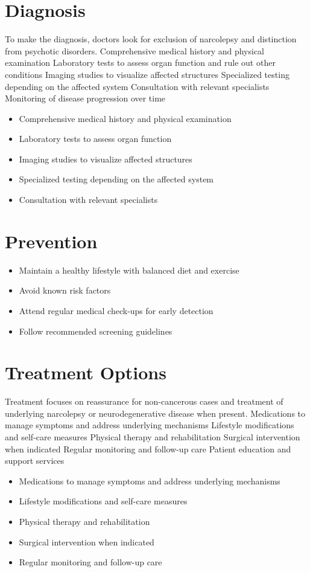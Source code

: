 \section{Diagnosis}
To make the diagnosis, doctors look for exclusion of narcolepsy and distinction from psychotic disorders. Comprehensive medical history and physical examination Laboratory tests to assess organ function and rule out other conditions Imaging studies to visualize affected structures Specialized testing depending on the affected system Consultation with relevant specialists Monitoring of disease progression over time

\begin{itemize}[noitemsep]
  \item Comprehensive medical history and physical examination
  \item Laboratory tests to assess organ function
  \item Imaging studies to visualize affected structures
  \item Specialized testing depending on the affected system
  \item Consultation with relevant specialists
\end{itemize}
\section{Prevention}
\begin{itemize}[noitemsep]
  \item Maintain a healthy lifestyle with balanced diet and exercise
  \item Avoid known risk factors
  \item Attend regular medical check-ups for early detection
  \item Follow recommended screening guidelines
\end{itemize}
\section{Treatment Options}
Treatment focuses on reassurance for non-cancerous cases and treatment of underlying narcolepsy or neurodegenerative disease when present. Medications to manage symptoms and address underlying mechanisms Lifestyle modifications and self-care measures Physical therapy and rehabilitation Surgical intervention when indicated Regular monitoring and follow-up care Patient education and support services

\begin{itemize}[noitemsep]
  \item Medications to manage symptoms and address underlying mechanisms
  \item Lifestyle modifications and self-care measures
  \item Physical therapy and rehabilitation
  \item Surgical intervention when indicated
  \item Regular monitoring and follow-up care
\end{itemize}
